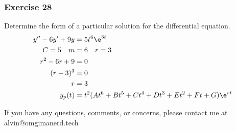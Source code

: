 \documentclass{math}
\begin{document}
\subsubsection*{Exercise 28}
Determine the form of a particular solution for the differential equation.
\begin{align*}
  y''-6y'+9y &= 5t^6\e^{3t} \\
  C = 5 \quad m &= 6 \quad r = 3 \\
  r^2-6r+9 &= 0 \\
  (r-3)^3 &= 0 \\
  r &= 3 \\
  y_p(t) &= t^2(At^6+Bt^5+Ct^4+Dt^3+Et^2+Ft+G)\e^{rt}
\end{align*}

\begin{center}
  If you have any questions, comments, or concerns, please contact me at
  alvin@omgimanerd.tech
\end{center}
\end{document}
